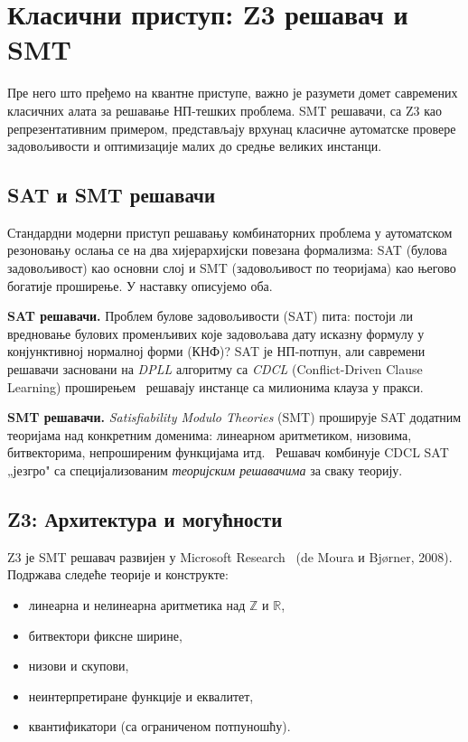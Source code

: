 \section{Класични приступ: Z3 решавач и SMT}
\label{sec:z3}

Пре него што пређемо на квантне приступе, важно је разумети домет
савремених класичних алата за решавање НП-тешких проблема.
SMT решавачи, са Z3 као репрезентативним примером, представљају
врхунац класичне аутоматске провере задовољивости и оптимизације
малих до средње великих инстанци.

\subsection{SAT и SMT решавачи}

Стандардни модерни приступ решавању комбинаторних проблема у
аутоматском резоновању ослања се на два хијерархијски повезана
формализма: SAT (булова задовољивост) као основни слој и SMT
(задовољивост по теоријама) као његово богатије проширење.
У наставку описујемо оба.

\textbf{SAT решавачи.}
Проблем булове задовољивости (\textsc{SAT}) пита: постоји ли вредновање
булових променљивих које задовољава дату исказну формулу у
конјунктивној нормалној форми (КНФ)?
\textsc{SAT} је НП-потпун, али савремени решавачи засновани
на \emph{DPLL} алгоритму са
\emph{CDCL} (Conflict-Driven Clause Learning) проширењем~\cite{biere2009}
решавају инстанце са милионима клауза у пракси.

\textbf{SMT решавачи.}
\emph{Satisfiability Modulo Theories} (SMT) проширује SAT додатним
теоријама над конкретним доменима: линеарном аритметиком,
низовима, битвекторима, непроширеним функцијама итд.~\cite{biere2009}
Решавач комбинује CDCL SAT „језгро" са специјализованим
\emph{теоријским решавачима} за сваку теорију.


\subsection{Z3: Архитектура и могућности}

Z3 је SMT решавач развијен у Microsoft Research~\cite{demoura2008,bjorner2014}
(de Moura и Bjørner, 2008).
Подржава следеће теорије и конструкте:
\begin{itemize}[nosep]
  \item линеарна и нелинеарна аритметика над $\mathbb{Z}$ и $\mathbb{R}$,
  \item битвектори фиксне ширине,
  \item низови и скупови,
  \item неинтерпретиране функције и еквалитет,
  \item квантификатори (са ограниченом потпуношћу).
\end{itemize}

